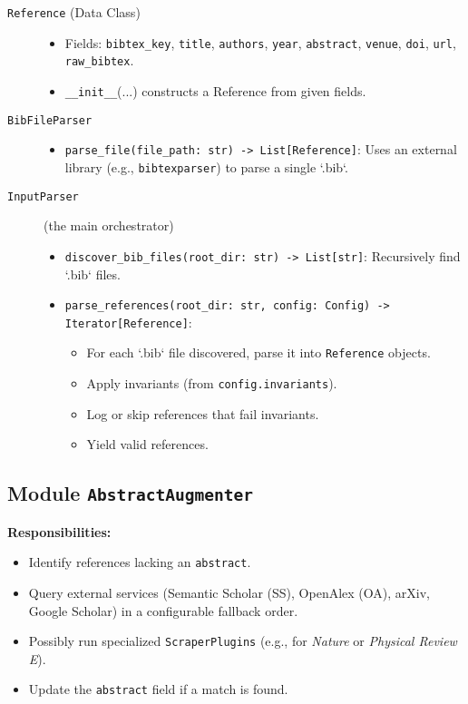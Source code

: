 \documentclass[12pt]{article}
\begin{document}
\begin{description}
  \item[\texttt{Reference} (Data Class)] 
  \begin{itemize}
    \item Fields: \texttt{bibtex\_key}, \texttt{title}, \texttt{authors}, \texttt{year}, \texttt{abstract}, \texttt{venue}, \texttt{doi}, \texttt{url}, \texttt{raw\_bibtex}.
    \item \texttt{\_\_init\_\_}(...) constructs a Reference from given fields.
  \end{itemize}
  
  \item[\texttt{BibFileParser}] 
  \begin{itemize}
    \item \texttt{parse\_file(file\_path: str) -> List[Reference]}: 
    Uses an external library (e.g., \texttt{bibtexparser}) to parse a single `.bib`.
  \end{itemize}
  
  \item[\texttt{InputParser}] (the main orchestrator)  
  \begin{itemize}
    \item \texttt{discover\_bib\_files(root\_dir: str) -> List[str]}: Recursively find `.bib` files.
    \item \texttt{parse\_references(root\_dir: str, config: Config) -> Iterator[Reference]}: 
      \begin{itemize}
        \item For each `.bib` file discovered, parse it into \texttt{Reference} objects.
        \item Apply invariants (from \texttt{config.invariants}).
        \item Log or skip references that fail invariants.
        \item Yield valid references.
      \end{itemize}
  \end{itemize}
\end{description}


\subsection{Module \texttt{AbstractAugmenter}}
\textbf{Responsibilities:}
\begin{itemize}
  \item Identify references lacking an \texttt{abstract}.
  \item Query external services (Semantic Scholar (SS), OpenAlex (OA), arXiv, Google Scholar) in a configurable fallback order.
  \item Possibly run specialized \texttt{ScraperPlugins} (e.g., for \emph{Nature} or \emph{Physical Review E}).
  \item Update the \texttt{abstract} field if a match is found. 
\end{itemize}
\end{document}
